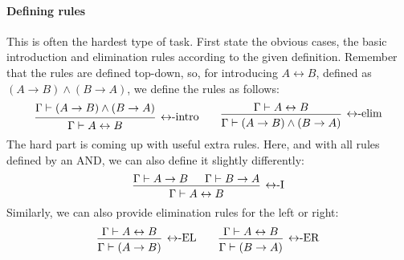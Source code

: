 \paragraph{Defining rules}
This is often the hardest type of task. First state the obvious cases, the basic introduction and elimination rules according to the given definition.
Remember that the rules are defined top-down, so, for introducing $A \leftrightarrow B$, defined as $(A \rightarrow B) \land (B \rightarrow A)$, we define the rules as follows:
\[
    \begin{prooftree}
        \hypo{\Gamma \vdash (A \rightarrow B) \land (B \rightarrow A)}
        \infer1[$\leftrightarrow$-intro]{\Gamma \vdash A \leftrightarrow B}
    \end{prooftree}
    \qquad
    \begin{prooftree}
        \hypo{\Gamma \vdash A \leftrightarrow B}
        \infer1[$\leftrightarrow$-elim]{\Gamma \vdash (A \rightarrow B) \land (B \rightarrow A)}
    \end{prooftree}
\]
The hard part is coming up with useful extra rules. Here, and with all rules defined by an AND, we can also define it slightly differently:
\[
    \begin{prooftree}
        \hypo{\Gamma \vdash A \rightarrow B}
        \hypo{\Gamma \vdash B \rightarrow A}
        \infer2[$\leftrightarrow$-I]{\Gamma \vdash A \leftrightarrow B}
    \end{prooftree}
\]
Similarly, we can also provide elimination rules for the left or right:
\[
    \begin{prooftree}
        \hypo{\Gamma \vdash A \leftrightarrow B}
        \infer1[$\leftrightarrow$-EL]{\Gamma \vdash (A \rightarrow B)}
    \end{prooftree}
    \qquad
    \begin{prooftree}
        \hypo{\Gamma \vdash A \leftrightarrow B}
        \infer1[$\leftrightarrow$-ER]{\Gamma \vdash (B \rightarrow A)}
    \end{prooftree}
\]

